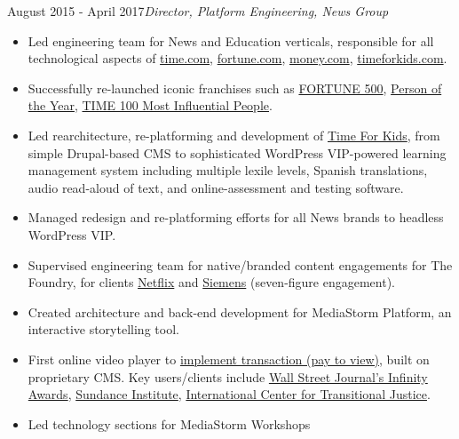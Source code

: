 \documentclass[a4paper,12pt]{memoir} %
\begin{document}

 {August 2015 - April 2017}{\textit{Director, Platform Engineering, News Group}}
\begin{itemize}
	\item Led engineering team for News and Education verticals, responsible for all technological aspects of \href{http://time.com}{time.com}, \href{http://fortune.com}{fortune.com},  \href{http://money.com}{money.com}, \href{https://www.timeforkids.com}{timeforkids.com}. 
	\item Successfully re-launched iconic franchises such as \href{http://fortune.com/fortune500}{FORTUNE 500}, \href{http://time.com/time-person-of-the-year-2017-silence-breakers/}{Person of the Year}, \href{http://time.com/collection/most-influential-people-2018/}{TIME 100 Most Influential People}.
	\item Led rearchitecture, re-platforming and development of \href{https://www.timeforkids}{Time For Kids}, from simple Drupal-based CMS to sophisticated WordPress VIP-powered learning management system including multiple lexile levels, Spanish translations, audio read-aloud of text, and online-assessment and testing software. 
	\item Managed redesign and re-platforming efforts for all News brands to headless WordPress VIP.
	\item Supervised engineering team for native/branded content engagements for The Foundry, for clients \href{http://time.com/paid-content-from/netflix/dinnertime/}{Netflix} and \href{http://time.com/partner/siemens/innovation-starts-here/}{Siemens} (seven-figure engagement).
\end{itemize}
\Sep %

\begin{itemize}
	\item Created architecture and back-end development for MediaStorm Platform, an interactive storytelling tool. 
	\item First online video player to \href{http://time.com/46716/game-changer-mediastorm-launches-pay-per-story-video-player/}{implement transaction (pay to view)}, built on proprietary CMS. Key users/clients include \href{https://mediastorm.com/clients/2018-icp-infinity-awards}{Wall Street Journal's Infinity Awards}, \href{https://mediastorm.com/clients/sundance-short-film-challenge}{Sundance Institute}, \href{https://mediastorm.com/clients/i-am-not-who-they-think-i-am-for-ictj}{International Center for Transitional Justice}. 
	\item Led technology sections for MediaStorm Workshops
\end{itemize}
\end{document}
